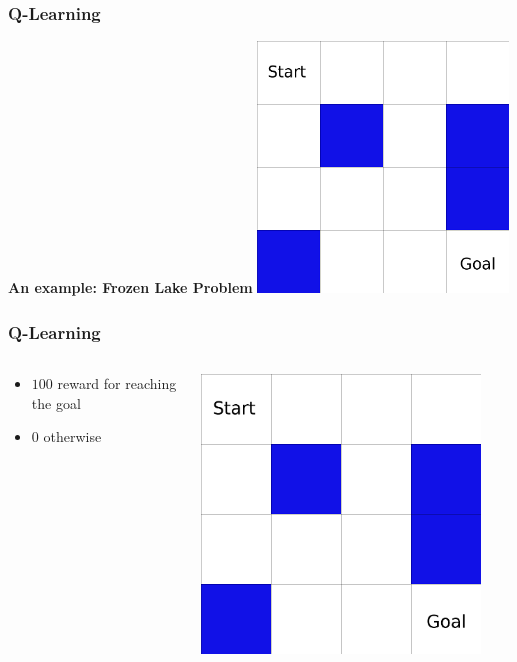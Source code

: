 \begin{frame}
\frametitle{Q-Learning}
  \begin{center}
  \textbf{An example: Frozen Lake Problem}
  \includegraphics[width=0.5\textwidth]{frozen-lake.png}
  \end{center}

\end{frame}
\begin{frame}
\frametitle{Q-Learning}
  \begin{columns}
    \begin{column}{0.5\textwidth}
    \begin{itemize}
      \item $100$ reward for reaching the goal
      \item $0$ otherwise
    \end{itemize}
    \end{column}
    \begin{column}{0.5\textwidth}
      \includegraphics[width=0.9\textwidth]{frozen-lake.png}
    \end{column}
  \end{columns}
\end{frame}

